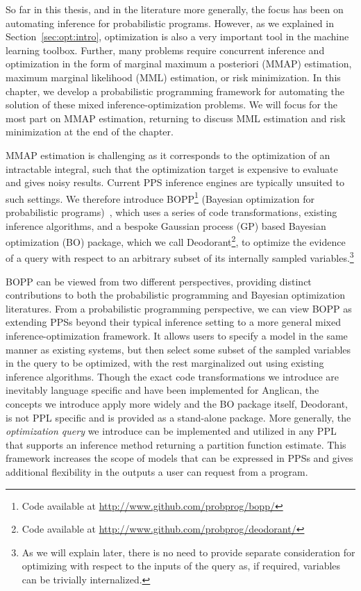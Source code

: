 
So far in this thesis, and in the literature more generally, the focus has been on automating
inference for probabilistic programs.  However, as we explained in Section~\ref{sec:opt:intro},
optimization is also a very important tool in the machine learning toolbox.  Further, many problems
require concurrent inference and optimization in the form of marginal maximum a posteriori (MMAP) estimation,
maximum marginal likelihood (MML) estimation, or risk minimization.  In this chapter, we develop a probabilistic programming framework
for automating the solution of these mixed inference-optimization problems.
We will focus for the most part on
MMAP estimation, returning to discuss MML estimation and risk minimization at the end of the chapter.

MMAP estimation is challenging as it corresponds to the optimization of an intractable integral, such that the 
optimization target is expensive to evaluate and gives noisy results.  Current PPS inference engines are 
typically unsuited to such settings.  We therefore introduce BOPP\footnote{Code available at \url{http://www.github.com/probprog/bopp/}}
(Bayesian optimization for probabilistic programs)~\citep{rainforth2015workshopbopp,rainforth2016bayesian}, 
which uses a series of code transformations, existing inference algorithms,
and a bespoke Gaussian process (GP) based Bayesian optimization (BO) package, which we call Deodorant\footnote{Code available
at \url{http://www.github.com/probprog/deodorant/}}, to optimize the evidence of a query with respect to
an arbitrary subset of its internally sampled variables.\footnote{As we will explain later, there is no need to
	provide separate consideration for optimizing with respect to the inputs of the query as, if required,
	variables can be trivially internalized.}

BOPP can be viewed from two different perspectives, providing distinct contributions to both the probabilistic
programming and Bayesian optimization literatures.  From a probabilistic programming perspective, we can
view BOPP as extending PPSs beyond their typical inference setting to a more
general mixed inference-optimization framework.  It allows users to specify a model in the same manner 
as existing systems, but then select some subset of the sampled variables in the query to be optimized, 
with the rest marginalized out using existing inference algorithms.  Though the exact code transformations we
introduce are inevitably language specific and have been implemented for Anglican, the concepts we
introduce apply more widely and the BO package itself, Deodorant, is not PPL specific and is provided
as a stand-alone package.  More generally, the \textit{optimization query} we 
introduce can be implemented and utilized in any PPL that supports an inference method returning a 
partition function estimate.  This framework increases the scope of models that can be expressed in
PPSs and gives additional flexibility in the outputs a user can request from a program.

